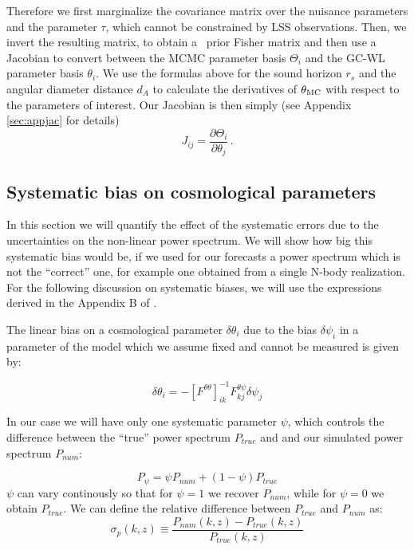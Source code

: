Therefore we first marginalize the covariance matrix over the nuisance
parameters and the parameter $\tau$, which cannot be constrained
by LSS observations. Then, we invert the resulting matrix, to obtain a \planck\
prior Fisher matrix and then use a Jacobian to convert between the
MCMC parameter basis $\Theta_{i}$ and the GC-WL parameter basis $\theta_{i}$.
We use the formulas above for the sound horizon $r_{s}$ and the angular
diameter distance $d_{A}$ to calculate the derivatives of $\theta_{\rm MC}$
with respect to the parameters of interest. Our Jacobian is then simply (see Appendix \ref{sec:appjac} for details)
\begin{equation}
J_{ij}=\frac{\partial\Theta_{i}}{\partial\theta_{j}} \, .
\end{equation}

\subsection{Systematic bias on cosmological parameters}

In this section we will quantify the effect of the systematic errors
due to the uncertainties on the non-linear power spectrum. We will
show how big this systematic bias would be, if we used for our forecasts
a power spectrum which is not the ``correct'' one, for example one
obtained from a single N-body realization. For the following discussion
on systematic biases, we will use the expressions derived in the Appendix
B of \cite{taylor_probing_2007}.

The linear bias on a cosmological parameter $\delta\theta_{i}$ due
to the bias $\delta\psi_{i}$ in a parameter of the model which we
assume fixed and cannot be measured is given by: 

\begin{equation}
\delta\theta_{i}=-\left[F^{\theta\theta}\right]_{ik}^{-1}F_{kj}^{\theta\psi}\delta\psi_{j}\label{eq:syst.bias}
\end{equation}


In our case we will have only one systematic parameter $\psi$, which
controls the difference between the ``true'' power spectrum $P_{true}$
and and our simulated power spectrum $P_{num}$:

\[
P_{\psi}=\psi P_{num}+(1-\psi)P_{true}
\]
$\psi$ can vary continously so that for $\psi=1$ we recover $P_{num}$,
while for $\psi=0$ we obtain $P_{true}$. We can define 
the relative difference between $P_{true}$ and $P_{num}$ as:
\begin{equation}
\sigma_{p}(k,z)\equiv\frac{P_{num}(k,z)-P_{true}(k,z)}{P_{true}(k,z)}
\end{equation}


